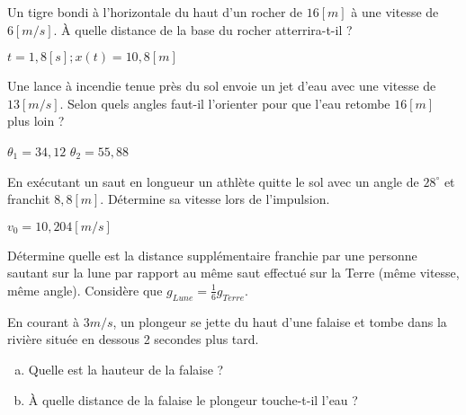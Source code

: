 \begin{exercise}
    Un tigre bondi à l'horizontale du haut d'un rocher de \(16[m]\) à une vitesse de \(6[m/s]\). À quelle distance de la base du rocher atterrira-t-il ?
\end{exercise}
\begin{solution}
    \(t=1,8[s] ; x(t)=10,8[m]\)
\end{solution}

\begin{exercise}
    Une lance à incendie tenue près du sol envoie un jet d'eau avec une vitesse de \(13[m/s]\). Selon quels angles faut-il l'orienter pour que l'eau retombe \(16[m]\) plus loin ?
\end{exercise}
\begin{solution}
    \(\theta _1 = 34,12 \)
    \(\theta _2 = 55,88 \)
\end{solution}


\begin{exercise}
    En exécutant un saut en longueur un athlète quitte le sol avec un angle de \(28^{\circ}\) et franchit \(8,8[m]\). Détermine sa vitesse lors de l'impulsion.
\end{exercise}
\begin{solution}
    \(v_0=10,204[m/s] \)
\end{solution}


\begin{exercise}
    Détermine quelle est la distance supplémentaire franchie par une personne sautant sur la lune par rapport au même saut effectué sur la Terre (même vitesse, même angle). Considère que \(g_{Lune}=\frac{1}{6} g_{Terre}\).
\end{exercise}


\begin{exercise}
    En courant à \(3m/s\), un plongeur se jette du haut d'une falaise et tombe dans la rivière située en dessous 2 secondes plus tard.
    \begin{enumerate}[a)]
        \item Quelle est la hauteur de la falaise ?
        \item À quelle distance de la falaise le plongeur touche-t-il l'eau ?
    \end{enumerate}
\end{exercise}